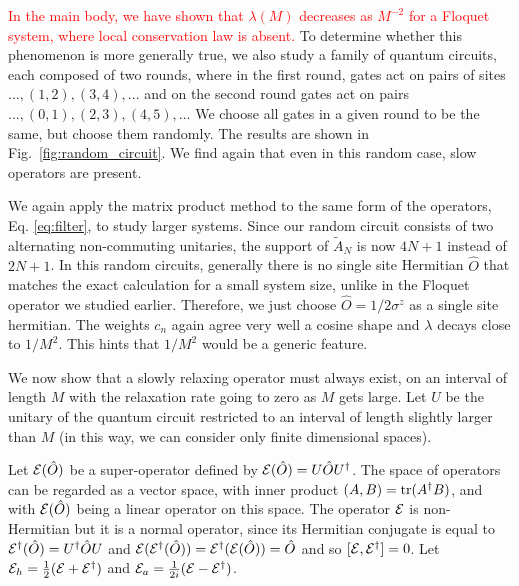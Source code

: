 \documentclass[twocolumn,superscriptaddress, prl,showpacs]{revtex4-1}
\newcommand{\addr}[1]{\textcolor{red}{#1}}
\begin{document}
\addr{ In the main body, we have shown that $\lambda(M)$ decreases as $M^{-2}$ for a Floquet system, where local conservation law is absent.}
To determine whether this phenomenon is more generally true, we also study a family of quantum circuits, each composed of two rounds, where in the first round, gates act on pairs of sites $...,(1,2),(3,4),...$ and on the second round gates act on pairs $...,(0,1),(2,3),(4,5),...$
We choose all gates in a given round to be the same, but choose them randomly.
The results are shown in Fig.~\ref{fig:random_circuit}.
We find again that even in this random case, slow operators are present.

We again apply the matrix product method to the same form of the operators, Eq. \eqref{eq:filter},
to study larger systems. Since our random circuit consists of two alternating non-commuting unitaries,
the support of $\tilde{A}_N$ is now $4N+1$ instead of $2N+1$.
In this random circuits, generally there is no single site Hermitian $\hat{O}$
that matches the exact calculation for a small system size, unlike in the Floquet operator we studied earlier.
Therefore, we just choose $\hat{O} = 1/2\sigma^z$ as a single site hermitian.
The weights $c_n$ again agree very well a cosine shape and $\lambda$ decays close to $1/M^2$.
This hints that $1/M^2$ would be a generic feature.


We now show that a slowly relaxing operator must always exist, on an interval of length $M$ with the relaxation rate going to zero as $M$ gets large.  Let $U$ be the unitary of the quantum circuit restricted to an interval of length slightly larger than $M$ (in this way, we can consider only finite dimensional spaces).

Let ${\cal E}(\hat{O})$ be a super-operator defined by ${\cal E}(\hat{O})=U\hat{O}U^\dagger$.  The space of operators can be regarded as a vector space, with inner product $(A,B)={\rm tr}(A^\dagger B)$, and with ${\cal E}(\hat{O})$ being a linear operator on this space.  The operator ${\cal E}$ is non-Hermitian but it is a normal operator, since its Hermitian conjugate is equal to ${\cal E}^\dagger(\hat{O})=U^\dagger \hat{O} U$ and ${\cal E}({\cal E}^\dagger(\hat{O}))={\cal E}^\dagger({\cal E}(\hat{O}))=\hat{O}$ and so $[{\cal E},{\cal E}^\dagger]=0$.
Let ${\cal E}_h=\frac{1}{2}({\cal E}+{\cal E}^\dagger)$ and ${\cal E}_a=\frac{1}{2i}({\cal E}-{\cal E}^\dagger)$.
\end{document}
